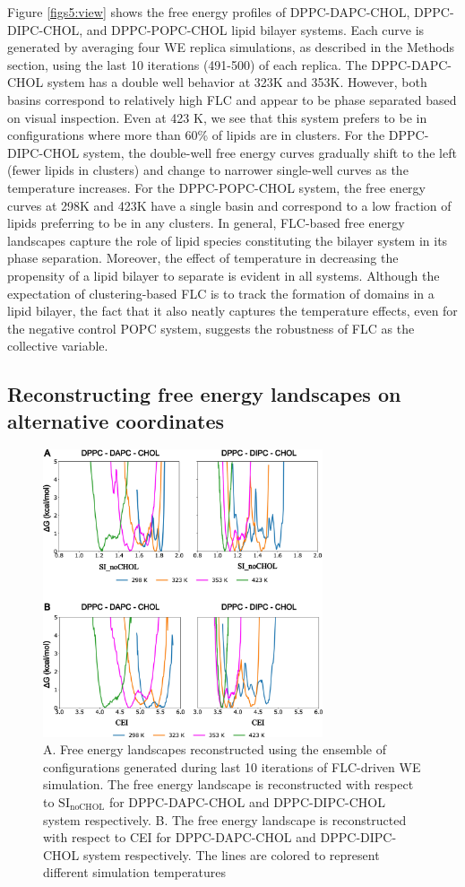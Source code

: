 \documentclass{biophys-new}
\begin{document}
Figure \ref{figs5:view} shows the free energy profiles of DPPC-DAPC-CHOL, DPPC-DIPC-CHOL, and DPPC-POPC-CHOL lipid bilayer systems.
Each curve is generated by averaging four WE replica simulations, as described in the Methods section, using the last 10 iterations (491-500) of each replica.
The DPPC-DAPC-CHOL system has a double well behavior at 323K and 353K.
However, both basins correspond to relatively high FLC and appear to be phase separated based on visual inspection.
Even at 423 K, we see that this system prefers to be in configurations where more than 60\% of lipids are in clusters.
For the DPPC-DIPC-CHOL system, the double-well free energy curves gradually shift to the left (fewer lipids in clusters) and change to narrower single-well curves as the temperature increases.
For the DPPC-POPC-CHOL system, the free energy curves at 298K and 423K have a single basin and correspond to a low fraction of lipids preferring to be in any clusters.
In general, FLC-based free energy landscapes capture the role of lipid species constituting the bilayer system in its phase separation.
Moreover, the effect of temperature in decreasing the propensity of a lipid bilayer to separate is evident in all systems.
Although the expectation of clustering-based FLC is to track the formation of domains in a lipid bilayer, the fact that it also neatly captures the temperature effects, even for the negative control POPC system, suggests the robustness of FLC as the collective variable.

\subsection*{Reconstructing free energy landscapes on alternative coordinates}

\begin{figure}[hbt!]
\centering
\includegraphics[width=3.25in]{Figures/Main/6/placeholder.jpg}
\caption{A. Free energy landscapes reconstructed using the ensemble of configurations generated during last 10 iterations of FLC-driven WE simulation. The free energy landscape is reconstructed with respect to $\text{SI}_{\text{noCHOL}}$ for DPPC-DAPC-CHOL and DPPC-DIPC-CHOL system respectively. B. The free energy landscape is reconstructed with respect to CEI for DPPC-DAPC-CHOL and DPPC-DIPC-CHOL system respectively. The lines are colored to represent different simulation temperatures}
\label{figs6:view}
\end{figure}
\end{document}
